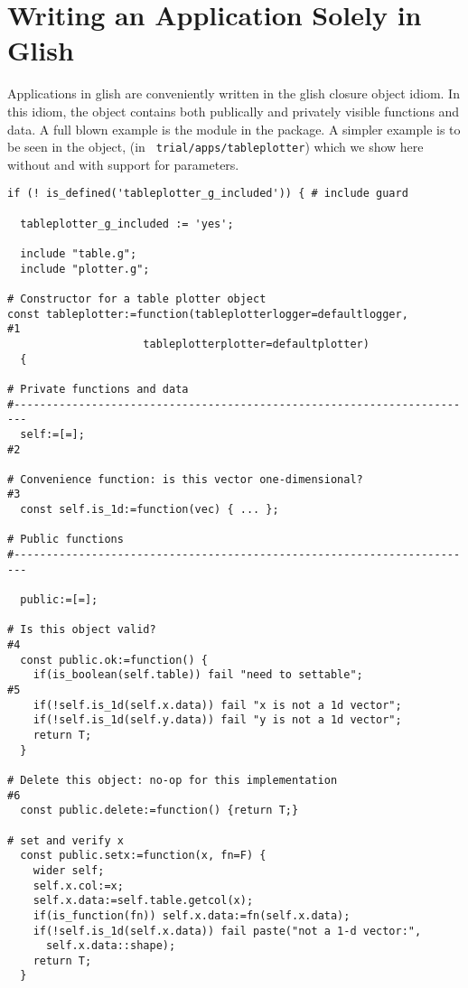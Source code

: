 \section{Writing an Application Solely in Glish}
\label{sec:glishapp}

Applications in glish are conveniently written in the glish closure
object idiom. In this idiom, the object contains both publically and
privately visible functions and data. A full blown example is the
 module in the 
package. A simpler example is to be seen in the
 object, (in {\tt 
trial/apps/tableplotter}) which we show here without and with support for
parameters.

\begin{verbatim}
if (! is_defined('tableplotter_g_included')) { # include guard
  
  tableplotter_g_included := 'yes';
  
  include "table.g";
  include "plotter.g";
  
# Constructor for a table plotter object
const tableplotter:=function(tableplotterlogger=defaultlogger,         #1
	        	     tableplotterplotter=defaultplotter) 
  {
    
# Private functions and data
#------------------------------------------------------------------------
  self:=[=];                                                           #2

# Convenience function: is this vector one-dimensional?                #3
  const self.is_1d:=function(vec) { ... };

# Public functions
#------------------------------------------------------------------------

  public:=[=];

# Is this object valid?                                                #4
  const public.ok:=function() {
    if(is_boolean(self.table)) fail "need to settable";                #5
    if(!self.is_1d(self.x.data)) fail "x is not a 1d vector";
    if(!self.is_1d(self.y.data)) fail "y is not a 1d vector";
    return T;
  }

# Delete this object: no-op for this implementation                    #6
  const public.delete:=function() {return T;}

# set and verify x
  const public.setx:=function(x, fn=F) {
    wider self;
    self.x.col:=x;
    self.x.data:=self.table.getcol(x);
    if(is_function(fn)) self.x.data:=fn(self.x.data);
    if(!self.is_1d(self.x.data)) fail paste("not a 1-d vector:",
      self.x.data::shape);
    return T;
  }


\end{verbatim}
